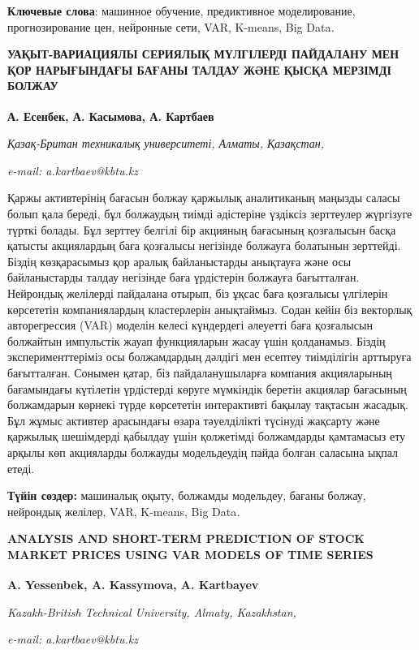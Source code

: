 {{\bfseries Ключевые слова}: машинное обучение, предиктивное моделирование,
прогнозирование цен, нейронные сети, VAR, K-means, Big Data\emph{.}

{\bfseries УАҚЫТ-ВАРИАЦИЯЛЫ СЕРИЯЛЫҚ МҮЛГІЛЕРДІ ПАЙДАЛАНУ МЕН ҚОР
НАРЫҒЫНДАҒЫ БАҒАНЫ ТАЛДАУ ЖӘНЕ ҚЫСҚА МЕРЗІМДІ БОЛЖАУ}

{\bfseries А. Есенбек, А. Касымова, А. Картбаев\textsuperscript{\envelope }}

\emph{Қазақ-Британ техникалық университеті, Алматы, Қазақстан,}

\emph{e-mail: a.kartbaev@kbtu.kz}

Қаржы активтерінің бағасын болжау қаржылық аналитиканың маңызды саласы
болып қала береді, бұл болжаудың тиімді әдістеріне үздіксіз зерттеулер
жүргізуге түрткі болады. Бұл зерттеу белгілі бір акцияның бағасының
қозғалысын басқа қатысты акциялардың баға қозғалысы негізінде болжауға
болатынын зерттейді. Біздің көзқарасымыз қор аралық байланыстарды
анықтауға және осы байланыстарды талдау негізінде баға үрдістерін
болжауға бағытталған. Нейрондық желілерді пайдалана отырып, біз ұқсас
баға қозғалысы үлгілерін көрсететін компаниялардың кластерлерін
анықтаймыз. Содан кейін біз векторлық авторегрессия (VAR) моделін келесі
күндердегі әлеуетті баға қозғалысын болжайтын импульстік жауап
функцияларын жасау үшін қолданамыз. Біздің эксперименттеріміз осы
болжамдардың дәлдігі мен есептеу тиімділігін арттыруға бағытталған.
Сонымен қатар, біз пайдаланушыларға компания акцияларының бағамындағы
күтілетін үрдістерді көруге мүмкіндік беретін акциялар бағасының
болжамдарын көрнекі түрде көрсететін интерактивті бақылау тақтасын
жасадық. Бұл жұмыс активтер арасындағы өзара тәуелділікті түсінуді
жақсарту және қаржылық шешімдерді қабылдау үшін қолжетімді болжамдарды
қамтамасыз ету арқылы көп акцияларды болжауды модельдеудің пайда болған
саласына ықпал етеді.

{\bfseries Түйін сөздер:} машиналық оқыту, болжамды модельдеу, бағаны
болжау, нейрондық желілер, VAR, K-means, Big Data\emph{.}

{\bfseries ANALYSIS AND SHORT-TERM PREDICTION OF STOCK MARKET PRICES USING
VAR MODELS OF TIME SERIES}

{\bfseries A. Yessenbek, A. Kassymova, A. Kartbayev\textsuperscript{\envelope }}

\emph{Kazakh-British Technical University, Almaty, Kazakhstan,}

\emph{e-mail: a.kartbaev@kbtu.kz}

}
